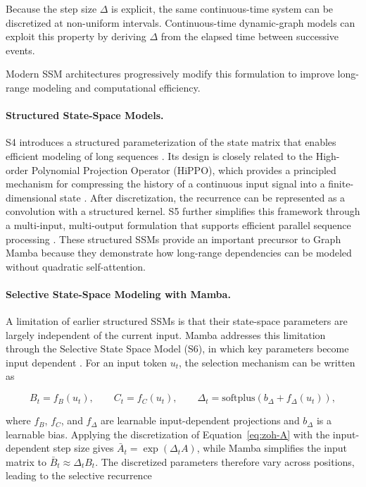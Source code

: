 \documentclass[acmsmall]{acmart}
\begin{document}
Because the step size $\Delta$ is explicit, the same continuous-time system can
be discretized at non-uniform intervals. Continuous-time dynamic-graph models
can exploit this property by deriving $\Delta$ from the elapsed time between
successive events.

Modern SSM architectures progressively modify this formulation to improve
long-range modeling and computational efficiency.

\paragraph{\textbf{Structured State-Space Models.}}
S4 introduces a structured parameterization of the state matrix that enables
efficient modeling of long sequences \cite{gu2021efficiently}. Its design is
closely related to the High-order Polynomial Projection Operator (HiPPO),
which provides a principled mechanism for compressing the history of a
continuous input signal into a finite-dimensional state
\cite{gu2020hippo}. After discretization, the recurrence can be represented as
a convolution with a structured kernel. S5 further simplifies this
framework through a multi-input, multi-output formulation that supports
efficient parallel sequence processing \cite{smith2022simplified}. These
structured SSMs provide an important precursor to Graph Mamba because they
demonstrate how long-range dependencies can be modeled without quadratic
self-attention.

\paragraph{\textbf{Selective State-Space Modeling with Mamba.}}
A limitation of earlier structured SSMs is that their state-space parameters
are largely independent of the current input. Mamba addresses this limitation
through the Selective State Space Model (S6), in which key parameters become
input dependent \cite{gu2023mamba}. For an input token $u_t$, the selection
mechanism can be written as

\begin{equation}
B_t=f_B(u_t),
\qquad
C_t=f_C(u_t),
\qquad
\Delta_t=
\mathrm{softplus}\!\left(
b_{\Delta}+f_{\Delta}(u_t)
\right),
\label{eq:mamba-selection}
\end{equation}

where $f_B$, $f_C$, and $f_{\Delta}$ are learnable input-dependent
projections and $b_{\Delta}$ is a learnable bias.
Applying the discretization of Equation~\eqref{eq:zoh-A} with the input-dependent step size gives $\bar{A}_t=\exp(\Delta_t A)$, while Mamba simplifies the input matrix to $\bar{B}_t\approx\Delta_t B_t$. The discretized parameters
therefore vary across positions, leading to the selective recurrence
\end{document}
